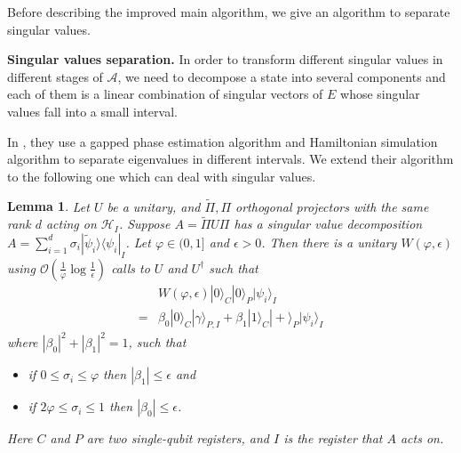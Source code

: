 \documentclass[journal]{IEEEtran}
\newtheorem{lemma}{Lemma}
\newcommand{\algo}[1]{\hyperref[algo:#1]{Algorithm~\ref*{algo:#1}}}
\renewcommand{\sec}[1]{\hyperref[sec:#1]{Section~\ref*{sec:#1}}}
\newcommand{\syzn}[1]{{\color{violet}{#1}}}
\begin{document}

Before describing the improved main algorithm, we give an algorithm to separate singular values.


\vspace{3mm}
\noindent
\textbf{Singular values separation.}
In order to transform different singular values in different stages of $\mathcal{A}$, we need to decompose a state into several components and each of them is a linear combination of singular vectors of $E$ whose singular values fall into a small interval.

In \cite{childs2017}, they use a gapped phase estimation  %
algorithm and Hamiltonian simulation algorithm to separate eigenvalues in different intervals. We extend their algorithm to the following one which can deal with singular values.

\begin{lemma}
\label{lem:separate_singular_value}
Let $U$ be a unitary, and $\widetilde{\Pi}, \Pi$ orthogonal projectors with the same rank $d$ acting on $\mathcal{H}_I$. Suppose $A = \widetilde{\Pi}U\Pi$ has a singular value decomposition $A = \sum_{i = 1}^d\sigma_i|\tilde{\psi}_i\rangle\langle \psi_i|_I$. Let $\varphi \in(0,1]$ and $\epsilon>0$. Then there is a unitary $W(\varphi,\epsilon)$ using $\mathcal{O}\left(\frac{1}{\varphi} \log \frac{1}{\epsilon}\right)$ calls to $U$ and $U^{\dagger}$ such that
\begin{align}
    &W(\varphi,\epsilon)|0\rangle_{C}|0\rangle_{P}|\psi_i\rangle_I \nonumber \\ =& \beta_{0}|0\rangle_C|\gamma\rangle_{P,I}+\beta_{1}|1\rangle_{C}|+\rangle_{P}|\psi_i\rangle_I
\end{align}
where $|\beta_{0}|^{2}+|\beta_{1}|^{2}=1$, such that
  \begin{itemize}
    \item if $0 \leq \sigma_i \leq \varphi$ then $\left|\beta_{1}\right| \leq \epsilon$ and
    \item if $2 \varphi \leq \sigma_i \leq 1$ then $\left|\beta_{0}\right| \leq \epsilon$.
          \label{lem:gpe}
  \end{itemize}
  Here $C$ and $P$ are two single-qubit registers, and $I$ is the register that $A$ acts on. %
\end{lemma}
\end{document}
